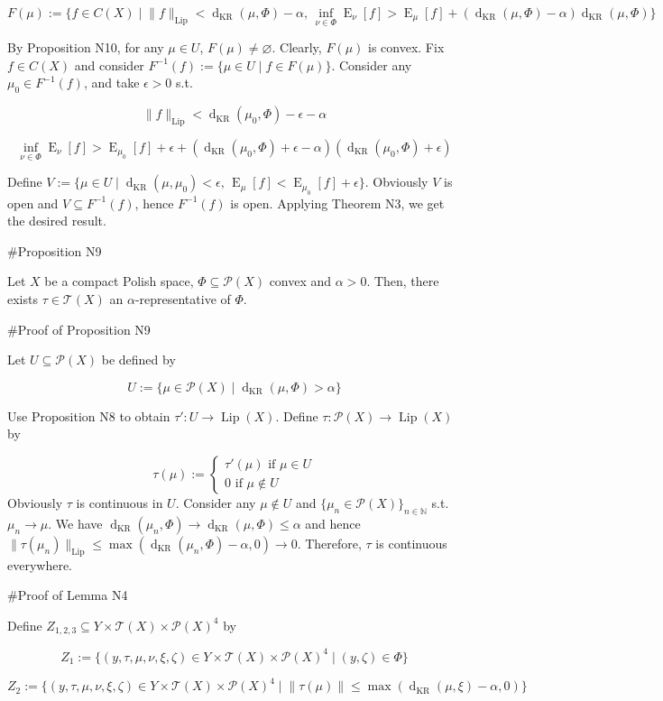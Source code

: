 \documentclass[a4paper]{article}
\DeclareMathOperator{\E}{E}
\newcommand{\Nats}{\mathbb{N}}
\newcommand{\Sq}[2]{\{#1\}_{#2 \in \Nats}}
\newcommand{\Sqn}[1]{\Sq{#1}{n}}
\newcommand{\Norm}[1]{\lVert #1 \rVert}
\newcommand{\Prob}{\mathcal{P}}
\newcommand{\T}{\mathcal{T}}
\newcommand{\Lip}{\operatorname{Lip}}
\newcommand{\NormL}[1]{\Norm{#1}_{\operatorname{Lip}}}
\newcommand{\Dkr}{\operatorname{d}_{\text{KR}}}
\begin{document}
$$F(\mu):=\{f \in C(X) \mid \NormL{f} < \Dkr(\mu, \Phi) - \alpha,\, \inf_{\nu \in \Phi} \E_\nu[f] > \E_\mu[f] + (\Dkr(\mu,\Phi) - \alpha) \Dkr(\mu,\Phi)\}$$

By Proposition N10, for any $\mu \in U$, $F(\mu) \ne \varnothing$. Clearly, $F(\mu)$ is convex. Fix $f \in C(X)$ and consider $F^{-1}(f):=\{\mu \in U \mid f \in F(\mu)\}$. Consider any $\mu_0 \in F^{-1}(f)$, and take $\epsilon > 0$ s.t.

$$\NormL{f} < \Dkr(\mu_0, \Phi)  - \epsilon - \alpha$$

$$\inf_{\nu \in \Phi} \E_\nu[f] > \E_{\mu_0}[f] + \epsilon + (\Dkr(\mu_0,\Phi) + \epsilon  - \alpha) (\Dkr(\mu_0,\Phi) + \epsilon)$$

Define $V := \{\mu \in U \mid \Dkr(\mu,\mu_0) < \epsilon,\, \E_\mu[f] < \E_{\mu_0}[f] + \epsilon\}$. Obviously $V$ is open and $V \subseteq F^{-1}(f)$, hence $F^{-1}(f)$ is open. Applying Theorem N3, we get the desired result.

\#Proposition N9

Let $X$ be a compact Polish space, $\Phi \subseteq \Prob(X)$ convex and $\alpha > 0$. Then, there exists $\tau \in \T(X)$ an $\alpha$-representative of $\Phi$.

\#Proof of Proposition N9

Let $U \subseteq \Prob(X)$ be defined by

$$U:=\{\mu \in \Prob(X) \mid \Dkr(\mu, \Phi) > \alpha\}$$

Use Proposition N8 to obtain $\tau': U \rightarrow \Lip(X)$. Define $\tau: \Prob(X) \rightarrow \Lip(X)$ by

$$\tau(\mu):=\begin{cases}\tau'(\mu) \text{ if } \mu \in U\\0 \text { if } \mu \not\in U\end{cases}$$ 
Obviously $\tau$ is continuous in $U$. Consider any $\mu \not\in U$ and $\Sqn{\mu_n \in \Prob(X)}$ s.t. $\mu_n \rightarrow \mu$. We have $\Dkr(\mu_n,\Phi) \rightarrow \Dkr(\mu, \Phi) \leq \alpha$ and hence $\NormL{\tau(\mu_n)} \leq \max(\Dkr(\mu_n,\Phi) - \alpha, 0) \rightarrow 0$. Therefore, $\tau$ is continuous everywhere.

\#Proof of Lemma N4

Define $Z_{1,2,3} \subseteq Y \times \T(X) \times \Prob(X)^4$ by

$$Z_1:=\{(y,\tau,\mu,\nu,\xi,\zeta) \in Y \times \T(X) \times \Prob(X)^4 \mid (y, \zeta) \in \Phi\}$$

$$Z_2:=\{(y,\tau,\mu,\nu,\xi,\zeta) \in Y \times \T(X) \times \Prob(X)^4 \mid \Norm{\tau(\mu)} \leq \max(\Dkr(\mu,\xi) - \alpha, 0)\}$$
\end{document}
